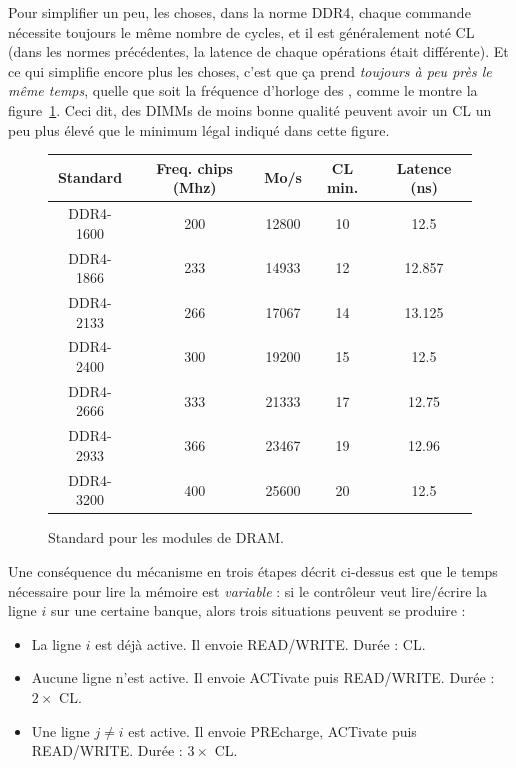 Pour simplifier un peu, les choses, dans la norme DDR4, chaque commande
nécessite toujours le même nombre de cycles, et il est généralement noté CL
(dans les normes précédentes, la latence de chaque opérations était
différente). Et ce qui simplifie encore plus les choses, c'est que ça prend
\emph{toujours à peu près le même temps}, quelle que soit la fréquence d'horloge
des , comme le montre la figure~\ref{tab:DDR-lat}. Ceci dit,
des DIMMs de moins bonne qualité peuvent avoir un CL un peu plus élevé que le
minimum légal indiqué dans cette figure.

\begin{figure}
  \centering
  \begin{tabular}{|c|c|c|c|c|}
  \hline
Standard   & Freq. chips (Mhz) & Mo/s  & CL min. & Latence (ns) \\
  \hline\hline                                                                    
DDR4-1600  & 200               & 12800 & 10      & 12.5   \\
DDR4-1866  & 233               & 14933 & 12      & 12.857 \\
DDR4-2133  & 266               & 17067 & 14      & 13.125 \\
DDR4-2400  & 300               & 19200 & 15      & 12.5   \\
DDR4-2666  & 333               & 21333 & 17      & 12.75  \\
DDR4-2933  & 366               & 23467 & 19      & 12.96  \\
DDR4-3200  & 400               & 25600 & 20      & 12.5   \\
  \hline                                                                                            
\end{tabular}
\caption{Standard pour les modules de DRAM. \label{tab:DDR-lat}}
\end{figure}

Une conséquence du mécanisme en trois étapes décrit ci-dessus est que le temps
nécessaire pour lire la mémoire est \emph{variable} : si le contrôleur veut
lire/écrire la ligne $i$ sur une certaine banque, alors trois situations peuvent
se produire :
\begin{itemize}
\item La ligne $i$ est déjà active. Il envoie READ/WRITE. Durée : CL.
\item Aucune ligne n'est active. Il envoie ACTivate puis READ/WRITE. Durée : $2\times$ CL.
\item Une ligne $j \neq i$ est active. Il envoie PREcharge, ACTivate puis READ/WRITE. Durée : $3\times$ CL.
\end{itemize}

